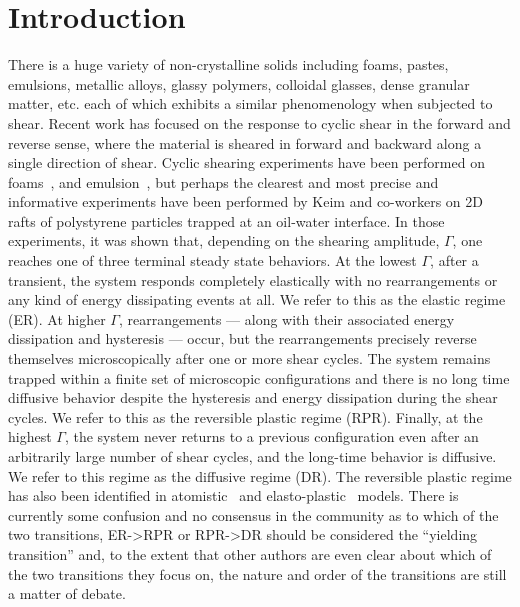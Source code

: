 \documentclass[%
 prl,
 amsmath,amssymb,
%
 reprint,%
]{revtex4-1}
\begin{document}
\section{\label{sec:intro} Introduction}
There is a huge variety of non-crystalline solids including foams, pastes, emulsions, metallic alloys, glassy polymers, colloidal glasses, dense granular matter, etc. each of which exhibits a similar phenomenology when subjected to shear. 
Recent work has focused on the response to cyclic shear in the forward and reverse sense, where the material is sheared in forward and backward along a single direction of shear.  
Cyclic shearing experiments have been performed on foams~\cite{Dennis-Ohern}, and emulsion~\cite{Cloitre,PineCipilletti},  but perhaps the clearest and most precise and informative experiments have been performed by Keim and co-workers on 2D rafts of polystyrene particles trapped at an oil-water interface.
In those experiments, it was shown that, depending on the shearing amplitude, $\Gamma$, one reaches one of three terminal steady state behaviors.
At the lowest $\Gamma$, after a transient, the system responds completely elastically with no rearrangements or any kind of energy dissipating events at all.
We refer to this as the elastic regime (ER).
At higher $\Gamma$, rearrangements — along with their associated energy dissipation and hysteresis — occur, but the rearrangements precisely reverse themselves microscopically after one or more shear cycles.
The system remains trapped within a finite set of microscopic configurations and there is no long time diffusive behavior despite the hysteresis and energy dissipation during the shear cycles.
We refer to this as the reversible plastic regime (RPR).
Finally, at the highest $\Gamma$, the system never returns to a previous configuration even after an arbitrarily large number of shear cycles, and the long-time behavior is diffusive.
We refer to this regime as the diffusive regime (DR).
The reversible plastic regime has also been identified in atomistic~\cite{ohern-denin, Regev} and elasto-plastic~\cite{kareem, muhitin-etal} models.
There is currently some confusion and no consensus in the community as to which of the two transitions, ER->RPR or RPR->DR should be considered the “yielding transition” and, to the extent that other authors are even clear about which of the two transitions they focus on, the nature and order of the transitions are still a matter of debate.
\end{document}
